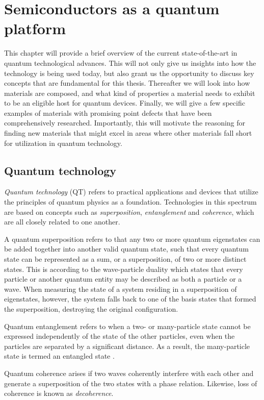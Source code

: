 \chapter{Semiconductors as a quantum platform}

This chapter will provide a brief overview of the current state-of-the-art in quantum technological advances. This will not only give us insights into how the technology is being used today, but also grant us the opportunity to discuss key concepts that are fundamental for this thesis. Thereafter we will look into how materials are composed, and what kind of properties a material needs to exhibit to be an eligible host for quantum devices. Finally, we will give a few specific examples of materials with promising point defects that have been comprehensively researched. Importantly, this will motivate the reasoning for finding new materials that might excel in areas where other materials fall short for utilization in quantum technology.

\section{Quantum technology}
\textit{Quantum technology} (QT) refers to practical applications and devices that utilize the principles of quantum physics as a foundation. Technologies in this spectrum are based on concepts such as \textit{superposition}, \textit{entanglement} and \textit{coherence}, which are all closely related to one another.

A quantum superposition refers to that any two or more quantum eigenstates can be added together into another valid quantum state, such that every quantum state can be represented as a sum, or a superposition, of two or more distinct states. This is according to the wave-particle duality which states that every particle or another quantum entity may be described as both a particle or a wave. When measuring the state of a system residing in a superposition of eigenstates, however, the system falls back to one of the basis states that formed the superposition, destroying the original configuration.

Quantum entanglement refers to when a two- or many-particle state cannot be expressed independently of the state of the other particles, even when the particles are separated by a significant distance. As a result, the many-particle state is termed an entangled state \cite{Griffiths2017}.

Quantum coherence arises if two waves coherently interfere with each other and generate a superposition of the two states with a phase relation. Likewise, loss of coherence is known as \textit{decoherence}.

